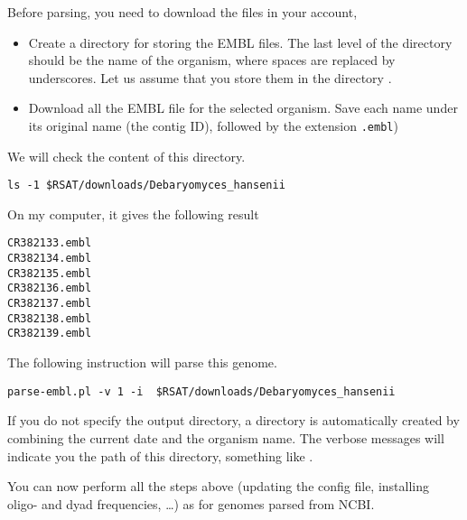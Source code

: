 Before parsing, you need to download the files in your account, 

\begin{itemize}
\item Create a directory for storing the EMBL files. The last level of
  the directory should be the name of the organism, where spaces are
  replaced by underscores. Let us assume that you store them in
  the directory .

\item Download all the EMBL file for the selected organism. Save each
  name under its original name (the contig ID), followed by the
  extension \texttt{.embl})

\end{itemize}

We will check the content of this directory.

\begin{footnotesize}
\begin{verbatim}
ls -1 $RSAT/downloads/Debaryomyces_hansenii
\end{verbatim}
\end{footnotesize}

On my computer, it gives the following result

\begin{footnotesize}
\begin{verbatim}
CR382133.embl
CR382134.embl
CR382135.embl
CR382136.embl
CR382137.embl
CR382138.embl
CR382139.embl
\end{verbatim}
\end{footnotesize}

The following instruction will parse this genome.

\begin{footnotesize}
\begin{verbatim}
parse-embl.pl -v 1 -i  $RSAT/downloads/Debaryomyces_hansenii
\end{verbatim}
\end{footnotesize}

If you do not specify the output directory, a directory is
automatically created by combining the current date and the organism
name.  The verbose messages will indicate you the path of this
directory, something like
.

You can now perform all the steps above (updating the config file,
installing oligo- and dyad frequencies, \ldots) as for genomes parsed
from NCBI.



